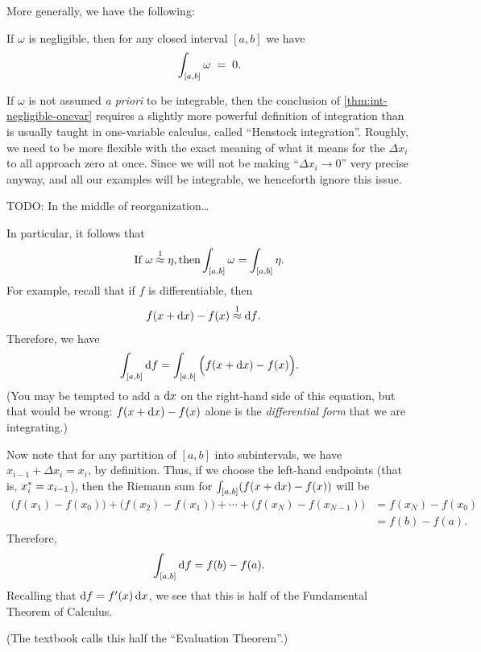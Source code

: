 More generally, we have the following:

\begin{thm}\label{thm:int-negligible-onevar}
  If $\omega$ is negligible, then for any closed interval $[a,b]$ we have
  \[ \int_{[a,b]} \omega \;=\; 0.\]
\end{thm}

\begin{adv}
  If $\omega$ is not assumed \emph{a priori} to be integrable, then the conclusion of \cref{thm:int-negligible-onevar} requires a slightly more powerful definition of integration than is usually taught in one-variable calculus, called ``Henstock integration''.
  Roughly, we need to be more flexible with the exact meaning of what it means for the $\Delta x_i$ to all approach zero at once.
  Since we will not be making ``$\Delta x_i\to 0$'' very precise anyway, and all our examples will be integrable, we henceforth ignore this issue.
\end{adv}

TODO: In the middle of reorganization\dots

In particular, it follows that
\begin{equation}\label{eq:int-apx1-equal}
  \text{If }\omega\mathrel{\overset{1}{\approx}}\eta, \text{then} \displaystyle\int_{[a,b]} \omega = \int_{[a,b]} \eta.
\end{equation}
For example, recall that if $f$ is differentiable, then
\begin{align*}
  f(x+\dx)-f(x) &\apx1 \df. %
\end{align*}
Therefore, we have
\[ \int_{[a,b]} {\mathrm{d} f} = \int_{[a,b]} \Big(f(x+{\mathrm{d} x}) - f(x)\Big). \]
(You may be tempted to add a ${\mathrm{d} x}$ on the right-hand side of this equation, but that would be wrong: $f(x+{\mathrm{d} x}) - f(x)$ alone is the \emph{differential form} that we are integrating.)

Now note that for any partition of $[a,b]$ into subintervals, we have $x_{i-1} + \Delta x_i = x_i$, by definition.
Thus, if we choose the left-hand endpoints (that is, ${x}_{i}^* = x_{i-1}$), then the Riemann sum for $\int_{[a,b]} (f(x+{\mathrm{d} x}) - f(x))$ will be
\begin{align*}
  \Big(f(x_1) - f(x_0)\Big) + \Big(f(x_2)-f(x_1)\Big) + \cdots + \Big(f(x_N) - f(x_{N-1})\Big)
  &= f(x_N) - f(x_0)\\
  &= f(b) - f(a).
\end{align*}
Therefore,
\begin{equation}
  \int_{[a,b]} {\mathrm{d} f} = f(b) - f(a).\label{eq:differential-ftc-eval}
\end{equation}
Recalling that ${\mathrm{d} f} = f'(x)\,{\mathrm{d} x}$, we see that this is half of the Fundamental Theorem of Calculus.
\begin{stewart}(The textbook calls this half the ``Evaluation Theorem''.)\end{stewart}

